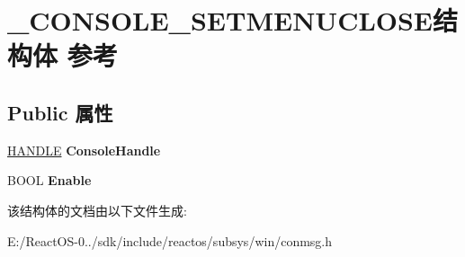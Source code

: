 \hypertarget{struct___c_o_n_s_o_l_e___s_e_t_m_e_n_u_c_l_o_s_e}{}\section{\+\_\+\+C\+O\+N\+S\+O\+L\+E\+\_\+\+S\+E\+T\+M\+E\+N\+U\+C\+L\+O\+S\+E结构体 参考}
\label{struct___c_o_n_s_o_l_e___s_e_t_m_e_n_u_c_l_o_s_e}
\subsection*{Public 属性}
\begin{DoxyCompactItemize}
\item 
\mbox{\label{struct___c_o_n_s_o_l_e___s_e_t_m_e_n_u_c_l_o_s_e_a339cf32e3ece33d725b69d94b4a208b1}} 
\hyperlink{interfacevoid}{H\+A\+N\+D\+LE} {\bfseries Console\+Handle}
\item 
\mbox{\label{struct___c_o_n_s_o_l_e___s_e_t_m_e_n_u_c_l_o_s_e_a626d215b113874acbcc62b9a5ebadd0a}} 
B\+O\+OL {\bfseries Enable}
\end{DoxyCompactItemize}


该结构体的文档由以下文件生成\+:\begin{DoxyCompactItemize}
\item 
E\+:/\+React\+O\+S-\/0../sdk/include/reactos/subsys/win/conmsg.\+h\end{DoxyCompactItemize}
